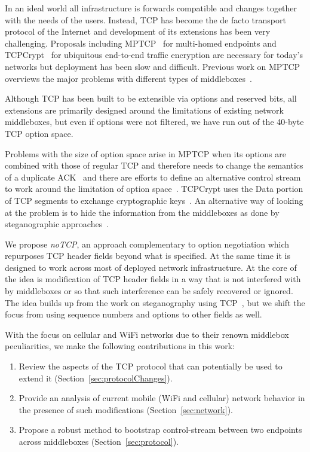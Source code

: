 \documentclass{sig-alternate-10pt}
\begin{document}
In an ideal world all infrastructure is forwards compatible and changes together with the needs of the users. Instead, TCP has become the de facto transport protocol of the Internet and development of its extensions has been very challenging. Proposals including MPTCP~\cite{Handley:vj} for multi-homed endpoints and TCPCrypt~\cite{Mazieres:uz} for ubiquitous end-to-end traffic encryption are necessary for today's networks but deployment has been slow and difficult. Previous work on MPTCP overviews the major problems with different types of middleboxes~\cite{Raiciu:2012ur}.

Although TCP has been built to be extensible via options and reserved bits, all extensions are primarily designed around the limitations of existing network middleboxes\cite{Honda,Guha2005tb,UntoldMiddlebox2011}, but even if options were not filtered, we have run out of the 40-byte TCP option space.

Problems with the size of option space arise in MPTCP when its options are combined with those of regular TCP and therefore needs to change the semantics of a duplicate ACK~\cite{Handley:vj} and there are efforts to define an alternative control stream to work around the limitation of option space~\cite{Bonaventure:wx}. TCPCrypt uses the Data portion of TCP segments to exchange cryptographic keys~\cite{Mazieres:uz}. An alternative way of looking at the problem is to hide the information from the middleboxes as done by steganographic approaches~\cite{Frczek:2012dl,Zielinska:2014fn,Rowland:1997vq,Murdoch:2005fz}.

We propose \emph{noTCP}, an approach complementary to option negotiation which repurposes TCP header fields beyond what is specified. At the same time it is designed to work across most of deployed network infrastructure. At the core of the idea is modification of TCP header fields in a way that is not interfered with by middleboxes or so that such interference can be safely recovered or ignored. The idea builds up from the work on steganography using TCP~\cite{Frczek:2012dl,Murdoch:2005fz}, but we shift the focus from using sequence numbers and options to other fields as well.

With the focus on cellular and WiFi networks due to their renown middlebox peculiarities, we make the following contributions in this work:

\begin{enumerate}
    \item Review the aspects of the TCP protocol that can potentially be used to extend it (Section~\ref{sec:protocolChanges}).
    \item Provide an analysis of current mobile (WiFi and cellular) network behavior in the presence of such modifications (Section~\ref{sec:network}).
    \item Propose a robust method to bootstrap control-stream between two endpoints across middleboxes (Section~\ref{sec:protocol}).
\end{enumerate}
\end{document}
